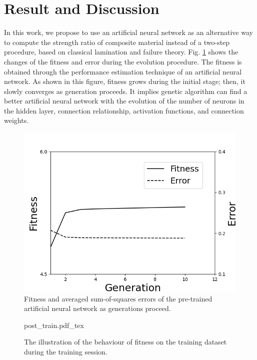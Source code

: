 \section{Result and Discussion}

In this work, we propose to use an artificial neural network as an alternative
way to compute the strength ratio of composite material instead of a two-step
procedure, based on classical lamination and failure theory.
Fig. \ref{fig:ga_nn} shows the changes of the fitness and error during the
evolution procedure. The fitness is obtained through the performance estimation
technique of an artificial neural network. As shown in this figure, fitness
grows during the initial stage; then, it slowly converges as generation
proceeds. It implies genetic algorithm can find a better artificial neural
network with the evolution of the number of neurons in the hidden layer,
connection relationship, activation functions, and connection weights.

\begin{figure}[!tb]
	\includegraphics[width=0.9\linewidth]{Figures/chapter4/fig/result_ga_ann.png}
	\caption{Fitness and averaged sum-of-squares errors of the pre-trained artificial neural network as generations proceed.}
	\label{fig:ga_nn}
\end{figure}

\begin{figure}[!tb]
	\centering
	\def\svgwidth{\columnwidth}
	{post_train.pdf_tex}
	\caption{The illustration of the behaviour of fitness on the training dataset during the training session.}
	\label{fig:final_train}
\end{figure}


